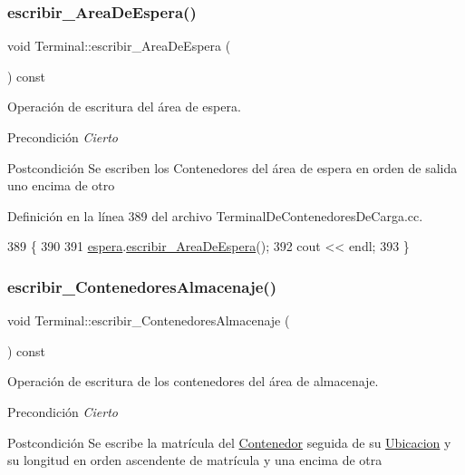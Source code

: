 \subsubsection{\texorpdfstring{escribir\+\_\+\+Area\+De\+Espera()}{escribir\_AreaDeEspera()}}
{\footnotesize\ttfamily void Terminal\+::escribir\+\_\+\+Area\+De\+Espera (\begin{DoxyParamCaption}{ }\end{DoxyParamCaption}) const}



Operación de escritura del área de espera. 

\begin{DoxyPrecond}{Precondición}
{\itshape Cierto} 
\end{DoxyPrecond}
\begin{DoxyPostcond}{Postcondición}
Se escriben los Contenedores del área de espera en orden de salida uno encima de otro 
\end{DoxyPostcond}


Definición en la línea 389 del archivo Terminal\+De\+Contenedores\+De\+Carga.\+cc.


\begin{DoxyCode}
389                                            \{
390     
391     \hyperlink{class_terminal_ac9f71207d73c8d05a9d9d6c046f9f8c3}{espera}.\hyperlink{class_espera_aacb008e5be8ecd85fbba9cdef8b8be33}{escribir\_AreaDeEspera}();
392     cout << endl;
393 \}
\end{DoxyCode}
\mbox{\label{class_terminal_a24c74e2dd8c8e41452a7e890bc925f0e}} 
\subsubsection{\texorpdfstring{escribir\+\_\+\+Contenedores\+Almacenaje()}{escribir\_ContenedoresAlmacenaje()}}
{\footnotesize\ttfamily void Terminal\+::escribir\+\_\+\+Contenedores\+Almacenaje (\begin{DoxyParamCaption}{ }\end{DoxyParamCaption}) const}



Operación de escritura de los contenedores del área de almacenaje. 

\begin{DoxyPrecond}{Precondición}
{\itshape Cierto} 
\end{DoxyPrecond}
\begin{DoxyPostcond}{Postcondición}
Se escribe la matrícula del \hyperlink{class_contenedor}{Contenedor} seguida de su \hyperlink{class_ubicacion}{Ubicacion} y su longitud en orden ascendente de matrícula y una encima de otra 
\end{DoxyPostcond}


